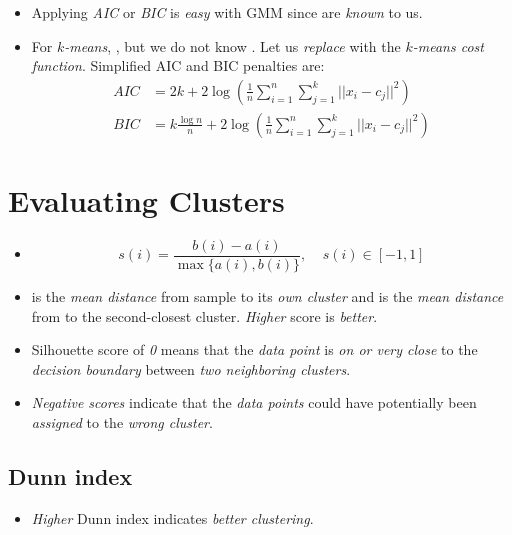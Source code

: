 \documentclass[
	number={6},
	title={Clustering}
]{cs584notes}
\begin{document}
\begin{itemize}
	\item Applying \emph{AIC} or \emph{BIC} is \emph{easy} with GMM since  are \emph{known} to us.
	\item For \emph{$k$-means}, , but we do not know .
	Let us \emph{replace}  with the \emph{$k$-means cost function}.
	Simplified AIC and BIC penalties are:
	\begin{equation}
		\begin{aligned}
			AIC &= 2k + 2\log\left( \frac{1}{n} \sum_{i=1}^{n} \sum_{j=1}^{k} || x_{i} - c_{j} ||^{2} \right)\\
			BIC &= k\frac{\log n}{n} + 2\log\left( \frac{1}{n} \sum_{i=1}^{n} \sum_{j=1}^{k} || x_{i} - c_{j} ||^{2} \right)
		\end{aligned}\label{eq:aic-bic-simplified}
	\end{equation}
\end{itemize}

\section{Evaluating Clusters}\label{sec:evaluating-clusters}
\begin{itemize}
	\item {}
	\begin{equation}
		s(i) = \frac{b(i) - a(i)}{\max\{a(i), b(i)\}},\ \ \ \ \ s(i) \in [-1, 1]
		\label{eq:silhouette-score}
	\end{equation}
	\item {} is the \emph{mean distance} from sample  to its \emph{own cluster} and  is the \emph{mean distance} from  to the second-closest cluster.
	\emph{Higher} score is \emph{better}.
	\item Silhouette score of \emph{0} means that the \emph{data point} is \emph{on or very close} to the \emph{decision boundary} between \emph{two neighboring clusters}.
	\item \emph{Negative scores} indicate that the \emph{data points} could have potentially been \emph{assigned} to the \emph{wrong cluster}.
\end{itemize}

\subsection{Dunn index}\label{subsec:dunn-index}
\begin{itemize}
	\item {}
	\emph{Higher} Dunn index indicates \emph{better clustering}.
\end{itemize}
\end{document}
